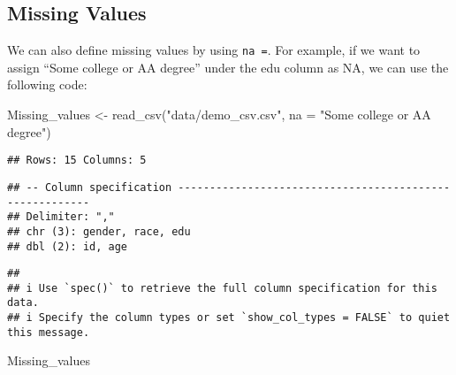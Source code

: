 \documentclass[
]{book}
\newenvironment{Shaded}{\begin{snugshade}}{\end{snugshade}}
\newcommand{\AttributeTok}[1]{\textcolor[rgb]{0.77,0.63,0.00}{#1}}
\newcommand{\FunctionTok}[1]{\textcolor[rgb]{0.00,0.00,0.00}{#1}}
\newcommand{\NormalTok}[1]{#1}
\newcommand{\OtherTok}[1]{\textcolor[rgb]{0.56,0.35,0.01}{#1}}
\newcommand{\StringTok}[1]{\textcolor[rgb]{0.31,0.60,0.02}{#1}}
\begin{document}
\hypertarget{missing-values}{%
\subsection{Missing Values}\label{missing-values}}

We can also define missing values by using \texttt{na\ =}. For example, if we want to assign ``Some college or AA degree'' under the edu column as NA, we can use the following code:

\begin{Shaded}
\begin{Highlighting}[]
\NormalTok{Missing\_values }\OtherTok{\textless{}{-}} \FunctionTok{read\_csv}\NormalTok{(}\StringTok{"data/demo\_csv.csv"}\NormalTok{,}
                           \AttributeTok{na =} \StringTok{"Some college or AA degree"}\NormalTok{)}
\end{Highlighting}
\end{Shaded}

\begin{verbatim}
## Rows: 15 Columns: 5
\end{verbatim}

\begin{verbatim}
## -- Column specification --------------------------------------------------------
## Delimiter: ","
## chr (3): gender, race, edu
## dbl (2): id, age
\end{verbatim}

\begin{verbatim}
## 
## i Use `spec()` to retrieve the full column specification for this data.
## i Specify the column types or set `show_col_types = FALSE` to quiet this message.
\end{verbatim}

\begin{Shaded}
\begin{Highlighting}[]
\NormalTok{Missing\_values}
\end{Highlighting}
\end{Shaded}
\end{document}
